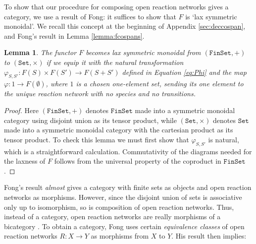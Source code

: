 \documentclass{compositionalityarticle}
\newcommand{\FinSet}{\mathtt{FinSet}}
\newcommand{\Set}{\mathtt{Set}}
\newcommand{\maps}{\colon}
\theoremstyle{compositionality}
\newtheorem{lem}[thm]{Lemma}
\theoremstyle{remark}
\begin{document}
To show that our procedure for composing open reaction networks gives a category, we use a result of Fong: it suffices to show that $F$ is `lax symmetric monoidal'.  We recall this concept at the beginning of Appendix \ref{sec:deccospan}, and Fong's result in Lemma \ref{lemma:fcospans}.

\begin{lem}
\label{lemma:RLax}
The functor $F$ becomes lax symmetric monoidal from $(\FinSet, +)$ to $(\Set, \times)$ if we equip it with the natural transformation $\varphi_{S,S'} \maps F(S) \times F(S') \to F(S + S')$ defined in Equation \eqref{eq:Phi} and the map $\varphi \maps 1 \to F(\emptyset)$, where $1$ is a chosen one-element set, sending its one element to the unique reaction network with no species and no transitions.
\end{lem}

\begin{proof}
Here $(\FinSet, +)$ denotes $\FinSet$ made into a symmetric monoidal category using  disjoint union as its tensor product, while  $(\Set, \times)$ denotes $\Set$ made into a symmetric monoidal category with the cartesian product as its tensor product.  
To check this lemma we must first show that $\varphi_{S,S'}$ is natural, which is a straightforward calculation.  Commutativity of the diagrams needed for the laxness of $F$ follows from the universal property of the coproduct in $\FinSet$.  \end{proof}

Fong's result \emph{almost} gives a category with finite sets as objects and open reaction networks as morphisms.  However, since the disjoint union of sets is associative only up to isomorphism, so is composition of open reaction networks.   Thus, instead of a category, open reaction networks are really morphisms of a bicategory \cite{Courser}.   To obtain a category, Fong uses certain \emph{equivalence classes} of open reaction networks $R \maps X \to Y$ as morphisms from $X$ to $Y$.  His result then implies:
\end{document}
